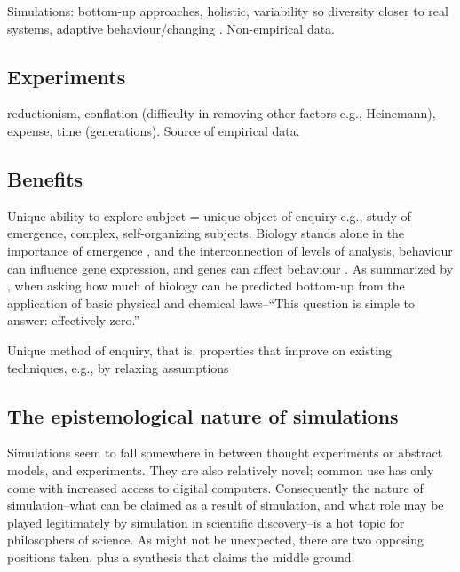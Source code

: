 Simulations: bottom-up approaches, holistic, variability so diversity
closer to real systems, adaptive behaviour/changing
\autocite{Ferrer:2008hv}. Non-empirical data.

\subsection{Experiments}\label{experiments}

reductionism, conflation (difficulty in removing other factors e.g.,
Heinemann), expense, time (generations). Source of empirical data.


\subsection{Benefits}\label{benefits}

Unique ability to explore subject = unique object of enquiry e.g., study
of emergence, complex, self-organizing subjects. Biology stands alone in
the importance of emergence \autocite{Bersini:2006ve}, and the
interconnection of levels of analysis, \eg behaviour can influence gene
expression, and genes can affect behaviour \autocite{Krakauer2011}. As
summarized by \autocite{Krakauer2011}, when asking how much of biology
can be predicted bottom-up from the application of basic physical and
chemical laws--``This question is simple to answer: effectively zero.''

Unique method of enquiry, that is, properties that improve on existing
techniques, e.g., by relaxing assumptions

\subsection{The epistemological nature of simulations}\label{the-epistemological-nature-of-simulations}

Simulations seem to fall somewhere in between thought experiments or
abstract models, and experiments. They are also relatively novel; common
use has only come with increased access to digital computers.
Consequently the nature of simulation--what can be claimed as a result
of simulation, and what role may be played legitimately by simulation in
scientific discovery--is a hot topic for philosophers of science. As
might not be unexpected, there are two opposing positions taken, plus a
synthesis that claims the middle ground.

